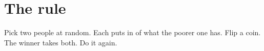 \section{The rule}

Pick two people at random.
Each puts in  of what the poorer one has.
Flip a coin. The winner takes both.
Do it again.



